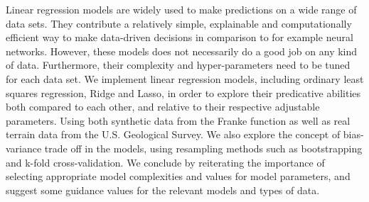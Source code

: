 Linear regression models are widely used to make predictions on a wide range of data sets.
They contribute a relatively simple, explainable and computationally efficient way to make data-driven decisions in comparison to for example neural networks.
However, these models does not necessarily do a good job on any kind of data.
Furthermore, their complexity and hyper-parameters need to be tuned for each data set.
We implement linear regression models, including ordinary least squares regression, Ridge and Lasso, in order to explore their predicative abilities both compared to each other, and relative to their respective adjustable parameters. 
Using both synthetic data from the Franke function \citep[p. 13]{frank} as well as real terrain data from the U.S. Geological Survey. 
We also explore the concept of bias-variance trade off in the models, using resampling methods such as bootstrapping and k-fold cross-validation. 
We conclude by reiterating the importance of selecting appropriate model complexities and values for model parameters, and suggest some guidance values for the relevant models and types of data. 

